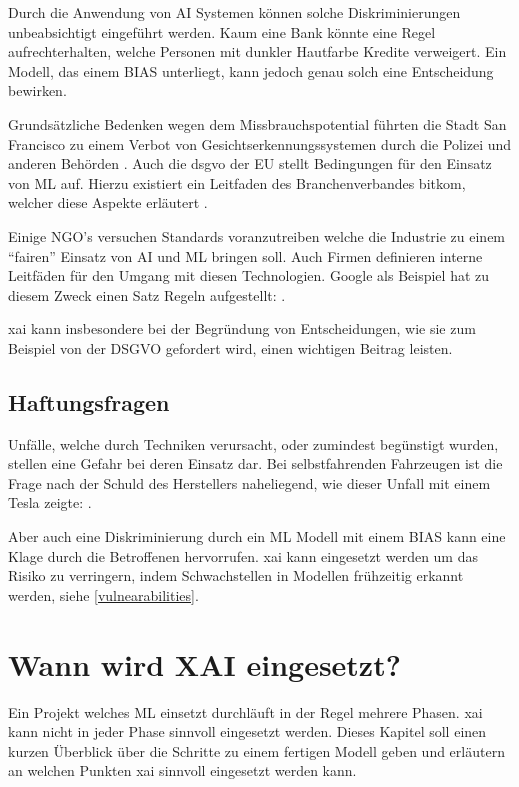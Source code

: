 \documentclass[
  12pt, %
  a4paper, %
  oneside, %
  openany, 
  numbers=noenddot, %
  BCOR=5mm, %
  parskip=half*, %
  thesis, %
]{bfhbook}
\begin{document}
Durch die Anwendung von \Gls{AI} Systemen können solche Diskriminierungen unbeabsichtigt eingeführt werden. Kaum eine Bank könnte eine Regel aufrechterhalten, welche Personen mit dunkler Hautfarbe Kredite verweigert. Ein Modell, das einem \Gls{BIAS} unterliegt, kann jedoch genau solch eine Entscheidung bewirken.

Grundsätzliche Bedenken wegen dem Missbrauchspotential  führten die Stadt San Francisco zu einem Verbot von Gesichtserkennungssystemen durch die Polizei und anderen Behörden \parencite{nyTimes}. Auch die \Gls{dsgvo} der EU stellt Bedingungen für den Einsatz von \Gls{ML} auf. Hierzu existiert ein Leitfaden des Branchenverbandes bitkom, welcher diese Aspekte erläutert \parencite{bitkom}.

Einige NGO's versuchen Standards voranzutreiben welche die Industrie zu einem ``fairen'' Einsatz von \Gls{AI} und \Gls{ML} bringen soll. Auch Firmen definieren interne Leitfäden für den Umgang mit diesen Technologien. Google als Beispiel  hat zu diesem Zweck einen Satz Regeln aufgestellt: \parencite{aiGoogle}.

\Gls{xai} kann insbesondere bei der Begründung von Entscheidungen, wie sie zum Beispiel von der \acrshort{DSGVO} gefordert wird, einen wichtigen Beitrag leisten.

\section{Haftungsfragen}
Unfälle, welche durch  Techniken verursacht, oder zumindest begünstigt wurden, stellen eine Gefahr bei deren Einsatz dar. Bei selbstfahrenden Fahrzeugen ist die Frage nach der Schuld des Herstellers naheliegend, wie dieser Unfall mit einem Tesla zeigte: \parencite{teslaCrash}. 

Aber auch eine Diskriminierung durch ein \Gls{ML} Modell mit einem \Gls{BIAS} kann eine Klage durch die Betroffenen hervorrufen. \Gls{xai} kann eingesetzt werden um das Risiko zu verringern, indem Schwachstellen in Modellen frühzeitig erkannt werden, siehe \ref{vulnearabilities}. 

\chapter{Wann wird XAI eingesetzt?}
Ein Projekt welches \Gls{ML} einsetzt durchläuft in der Regel mehrere Phasen. \Gls{xai} kann nicht in jeder Phase sinnvoll eingesetzt werden. Dieses Kapitel soll einen kurzen Überblick über die Schritte zu einem fertigen Modell geben und erläutern an welchen Punkten \Gls{xai} sinnvoll eingesetzt werden kann.
\end{document}
